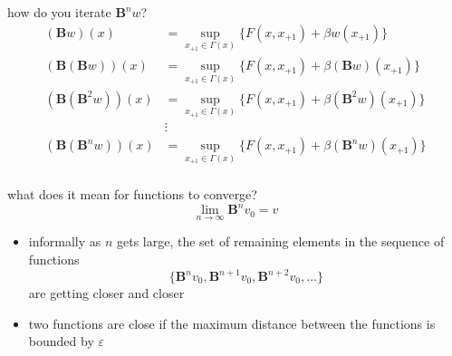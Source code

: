 \documentclass[compress,aspectratio=169]{beamer}
\begin{document}
\begin{frame}
how do you iterate $\mathbf B^nw$?
\begin{align*}
(\mathbf Bw)(x) & = \sup_{x_{+1}\in \Gamma(x)} \{F(x,x_{+1})+\beta w(x_{+1}) \} \\
(\mathbf B(\mathbf Bw))(x) & = \sup_{x_{+1}\in \Gamma(x)} \{F(x,x_{+1})+\beta (\mathbf Bw)(x_{+1}) \} \\
(\mathbf B(\mathbf B^2w))(x) & = \sup_{x_{+1}\in \Gamma(x)} \{F(x,x_{+1})+\beta (\mathbf B^2w)(x_{+1}) \} \\ 
& \vdots \\
(\mathbf B(\mathbf B^nw))(x) & = \sup_{x_{+1}\in \Gamma(x)} \{F(x,x_{+1})+\beta (\mathbf B^nw)(x_{+1}) \} \\ 
\end{align*}

\end{frame}

\begin{frame}
what does it mean for functions to converge? 
\begin{displaymath}
\lim_{n\rightarrow \infty} \mathbf B^nv_0=v
\end{displaymath}
\begin{itemize}
\item informally as $n$ gets large, the set of remaining elements in the sequence of functions
\begin{displaymath}
\{ \mathbf B^nv_0, \mathbf B^{n+1}v_0, \mathbf B^{n+2}v_0, \ldots \}
\end{displaymath}
are getting closer and closer
\vspace{2 mm}
\item two functions are close if the maximum distance between the functions is bounded by $\varepsilon$
\vspace{2 mm}
\end{itemize}
\end{frame}
\end{document}
